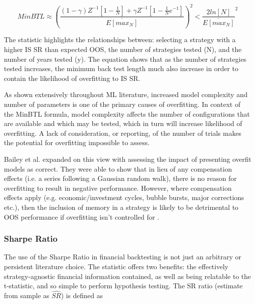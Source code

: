\documentclass[a4paper,latin]{paper}
\begin{document}
\begin{equation}\label{MinBTL}
MinBTL \approx (\frac{
                                  (1-\gamma)Z^{-1}[1-\frac{1}{N}] + \gamma Z^{-1}[1 -\frac{1}{N}e^{-1}]}
                                  {\overline{E[max_N]}})^2
                                  < \frac{2ln[N]}{\overline{E[max_N]}}^2
\end{equation}

The statistic highlights the relationships between: selecting a strategy with a higher IS SR than expected OOS, 
the number of strategies tested (N), and the number of years tested (y). The equation shows that  as the number 
of strategies tested increases, the minimum back test length much also increase in order to contain the likelihood 
of overfitting to IS SR. 
\hfill \break 

As shown extensively throughout ML literature, increased model complexity and number of parameters is one of 
the primary causes of overfitting. In context of the MinBTL formula, model complexity affects the number of 
configurations that are available and which may be tested, which in turn will increase likelihood of overfitting. 
A lack of consideration, or reporting, of the number of trials makes the potential for overfitting impossible to assess. 
\hfill \break 

Bailey et al. expanded on this view with assessing the impact of presenting overfit models as correct. 
They were able to show that in lieu of any compensation effects (i.e. a series following a Gaussian random walk), 
there is no reason for overfitting to result in negative performance. However, where compensation effects apply 
(e.g. economic/investment cycles, bubble bursts, major corrections etc.), then the inclusion of memory in a strategy
 is likely to be detrimental to OOS performance if overfitting isn’t controlled for \cite{BaileyBTL}.
\hfill \break 

\subsubsection {Sharpe Ratio}

The use of the Sharpe Ratio in financial backtesting is not just an arbitrary or persistent literature choice. 
The statistic offers two benefits: the effectively strategy-agnostic financial information contained, as well as being 
relatable to the t-statistic, and so simple to perform hypothesis testing. The SR ratio (estimate from sample as $\hat{SR}$) 
is defined as
\end{document}
